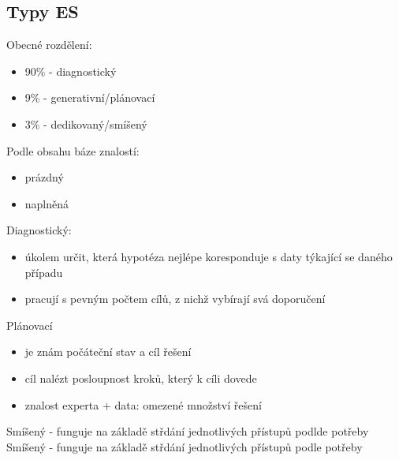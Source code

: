 \subsection{Typy ES}
Obecné rozdělení:
\begin{itemize}
    \item 90\% - diagnostický
    \item 9\% - generativní/plánovací
    \item 3\% - dedikovaný/smíšený
\end{itemize}
Podle obsahu báze znalostí:
\begin{itemize}
    \item prázdný
    \item naplněná
\end{itemize}

Diagnostický:
\begin{itemize}
    \item úkolem určit, která hypotéza nejlépe koresponduje s daty týkající se daného případu
    \item pracují s pevným počtem cílů, z nichž vybírají svá doporučení
\end{itemize}
Plánovací
\begin{itemize}
    \item je znám počáteční stav a cíl řešení
    \item cíl nalézt posloupnost kroků, který k cíli dovede
    \item znalost experta + data: omezené množství řešení
\end{itemize}

Smíšený - funguje na základě střdání jednotlivých přístupů podlde potřeby\\
Smíšený - funguje na základě střdání jednotlivých přístupů podle potřeby\\

